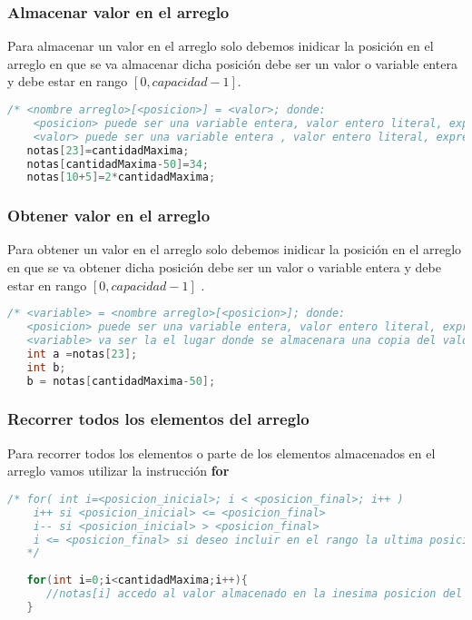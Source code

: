 \subsubsection{Almacenar valor en el arreglo}

Para almacenar un valor en el arreglo solo debemos inidicar la posición en el arreglo en que se va almacenar dicha posición debe ser un valor o variable entera y debe estar en rango $[0,capacidad-1]$.

\begin{lstlisting}[language=Java]
   /* <nombre arreglo>[<posicion>] = <valor>; donde:
    <posicion> puede ser una variable entera, valor entero literal, expresion cuyo resultado sea entero 
    <valor> puede ser una variable entera , valor entero literal, expresion cuyo resultado sea entero*/
   notas[23]=cantidadMaxima;
   notas[cantidadMaxima-50]=34;
   notas[10+5]=2*cantidadMaxima;
\end{lstlisting}


\subsubsection{Obtener valor en el arreglo}

Para obtener un valor en el arreglo solo debemos inidicar la posición en el arreglo en que se va obtener dicha posición debe ser un valor o variable entera y debe estar en rango $[0,capacidad-1]$ .

\begin{lstlisting}[language=Java]
   /* <variable> = <nombre arreglo>[<posicion>]; donde:
   <posicion> puede ser una variable entera, valor entero literal, expresion cuyo resultado sea entero 
   <variable> va ser la el lugar donde se almacenara una copia del valor solicitado al arreglo, debe ser del mismo tipo de dato del arreglo */
   int a =notas[23];
   int b;
   b = notas[cantidadMaxima-50];
\end{lstlisting}

\subsubsection{Recorrer todos los elementos del arreglo}

Para recorrer todos los elementos o parte de los elementos almacenados en el arreglo vamos utilizar la instrucción \textbf{for}

\begin{lstlisting}[language=Java]
   /* for( int i=<posicion_inicial>; i < <posicion_final>; i++ ) 
    i++ si <posicion_inicial> <= <posicion_final>
    i-- si <posicion_inicial> > <posicion_final>
    i <= <posicion_final> si deseo incluir en el rango la ultima posicion pero tiene que ser una posicion valida del arreglo
   */	
	
   for(int i=0;i<cantidadMaxima;i++){
      //notas[i] accedo al valor almacenado en la inesima posicion del arreglo
   }
\end{lstlisting}

